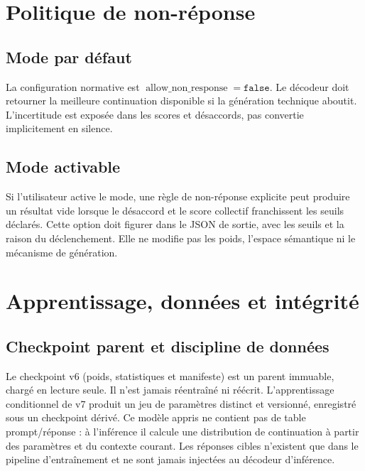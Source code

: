 \documentclass[11pt,a4paper]{report}
\begin{document}
\chapter{Politique de non-réponse}
\section{Mode par défaut}
La configuration normative est $\operatorname{allow\_non\_response}=\texttt{false}$. Le décodeur doit retourner la meilleure continuation disponible si la génération technique aboutit. L'incertitude est exposée dans les scores et désaccords, pas convertie implicitement en silence.

\section{Mode activable}
Si l'utilisateur active le mode, une règle de non-réponse explicite peut produire un résultat vide lorsque le désaccord et le score collectif franchissent les seuils déclarés. Cette option doit figurer dans le JSON de sortie, avec les seuils et la raison du déclenchement. Elle ne modifie pas les poids, l'espace sémantique ni le mécanisme de génération.

\chapter{Apprentissage, données et intégrité}
\section{Checkpoint parent et discipline de données}
Le checkpoint v6 (poids, statistiques et manifeste) est un parent immuable, chargé en lecture seule. Il n'est jamais réentraîné ni réécrit. L'apprentissage conditionnel de v7 produit un jeu de paramètres distinct et versionné, enregistré sous un checkpoint dérivé. Ce modèle appris ne contient pas de table prompt/réponse : à l'inférence il calcule une distribution de continuation à partir des paramètres et du contexte courant. Les réponses cibles n'existent que dans le pipeline d'entraînement et ne sont jamais injectées au décodeur d'inférence.
\end{document}
